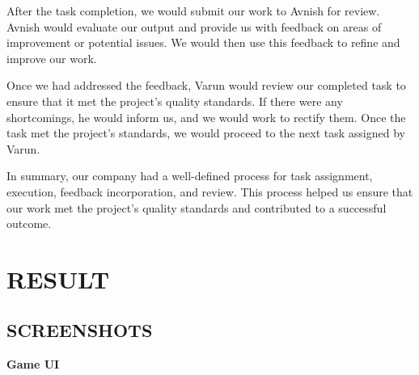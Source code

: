 \documentclass[12pt]{report}
\begin{document}
After the task completion, we would submit our work to Avnish for review. Avnish would evaluate our output and provide us with feedback on areas of improvement or potential issues. We would then use this feedback to refine and improve our work.

Once we had addressed the feedback, Varun would review our completed task to ensure that it met the project's quality standards. If there were any shortcomings, he would inform us, and we would work to rectify them. Once the task met the project's standards, we would proceed to the next task assigned by Varun.

In summary, our company had a well-defined process for task assignment, execution, feedback incorporation, and review. This process helped us ensure that our work met the project's quality standards and contributed to a successful outcome.

\clearpage


\centering


\centering
\section{RESULT}

\justifying
\setlength{\parindent}{4em}
\setlength{\parskip}{0.5em}
\renewcommand{\baselinestretch}{1.5}
\vspace{1cm}
\subsection{SCREENSHOTS}
\textbf{Game UI}
\end{document}
